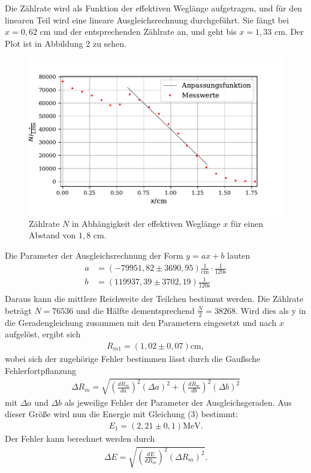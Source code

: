 \noindent Die Zählrate wird als Funktion der effektiven Weglänge aufgetragen, und für den linearen Teil wird eine lineare Ausgleichsrechnung durchgeführt. 
Sie fängt bei $x=0,62$ $\si{\cm}$ und der entsprechenden Zählrate an, und geht bis $x=1,33$ $\si{\cm}$.
Der Plot ist in Abbildung 2 zu sehen.
\begin{figure}[H]
  \centering
  \includegraphics{plot1.pdf}
  \caption{Zählrate $N$ in Abhängigkeit der effektiven Weglänge $x$ für einen Abstand von $1,8$ $\si{\cm}$. }
  \label{fig:plot}
\end{figure}

\noindent Die Parameter der Ausgleichsrechnung der Form $y=ax+b$ lauten
\begin{align*}
a &=  (-79951,82 \pm 3690,95) \frac{1}{\si{\centi\meter}}\cdot \frac{1}{120\si{\second}} \\
b &= (119937,39 \pm 3702,19) \frac{1}{120\si{\second}} \\
\end{align*}
Daraus kann die mittlere Reichweite der Teilchen bestimmt werden. Die Zählrate beträgt $N=76536$ und die Hälfte dementsprechend $\frac{N}{2}=38268$. Wird dies als y in die Geradengleichung zusammen mit den Parametern eingesetzt und nach $x$ aufgelöst, ergibt sich
\begin{align*}
R_{m1} = (1,02 \pm 0,07) \si{\centi\meter}, %
\end{align*}
wobei sich der zugehörige Fehler bestimmen lässt durch die Gaußsche Fehlerfortpflanzung
\begin{align*}
\Delta R_{m} = \sqrt{(\frac{dR_m}{da})^2 (\Delta a)^2 + (\frac{dR_m}{db})^2 (\Delta b)^2}
\end{align*}
mit $\Delta a $ und $\Delta b$ als jeweilige Fehler der Parameter der Ausgleichsgeraden.
Aus dieser Größe wird nun die Energie mit Gleichung (3) bestimmt:
\begin{align*}
E_{1} = (2,21 \pm 0,1) \si{\MeV}.
\end{align*}
Der Fehler kann berechnet werden durch
\begin{align*}
\Delta E = \sqrt{(\frac{dE}{dR_m})^2 (\Delta R_m)^2 }.
\end{align*}


